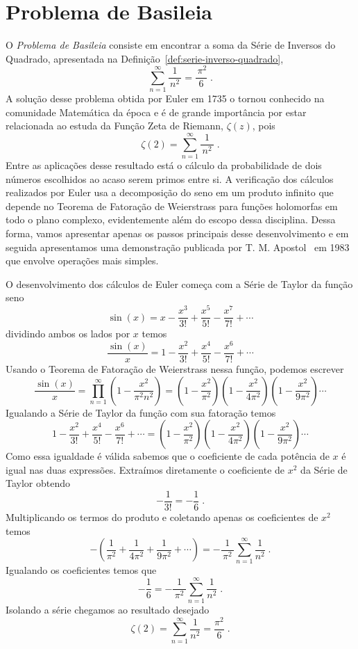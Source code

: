 \section{Problema de Basileia}
\label{sec:problema-Basileia}

O \emph{Problema de Basileia} consiste em
encontrar a soma da Série de Inversos do Quadrado,
apresentada na Definição~\ref{def:serie-inverso-quadrado},
\[
\sum_{n=1}^\infty \frac{1}{\,n^2\,} = \frac{\,\pi^2}{6}    \;.
\]
A solução desse problema obtida por Euler em 1735 o tornou conhecido na comunidade
Matemática da época e é de grande importância
por estar relacionada ao estuda da Função Zeta de Riemann, $\zeta(z)$,
pois
\[
\zeta(2) = \sum_{n=1}^\infty \frac{1}{\,n^2\,}    \;.
\]
Entre as aplicações desse resultado está o cálculo da probabilidade de dois
números escolhidos ao acaso serem primos entre si.
A verificação dos cálculos realizados por Euler usa a decomposição do seno
em um produto infinito que depende no Teorema de Fatoração de Weierstrass
para funções holomorfas
em todo o plano complexo, evidentemente além do escopo dessa disciplina.
Dessa forma, vamos apresentar apenas os passos principais desse desenvolvimento
e em seguida apresentamos uma demonstração
publicada por T. M. Apostol~\cite{Apostol-Proof-Euler-Missed} em 1983
que envolve operações mais simples.

O desenvolvimento dos cálculos de Euler começa com a Série de Taylor da função seno
\[
\sin(x) = x
- \frac{x^3}{3!}
+ \frac{x^5}{5!}
- \frac{x^7}{7!}
+ \cdots
\]
dividindo ambos os lados por $x$ temos
\[
\frac{\sin(x)}{x} = 1
- \frac{x^2}{3!}
+ \frac{x^4}{5!}
- \frac{x^6}{7!}
+ \cdots
\]
Usando o Teorema de Fatoração de Weierstrass nessa função, podemos escrever
\[
\frac{\sin(x)}{x} = \prod_{n=1}^{\infty} \left(1-\frac{x^2}{\pi^2n^2}\right)
= \left(1-\frac{x^2}{ \pi^2}\right)
\left(1-\frac{x^2}{4\pi^2}\right)
\left(1-\frac{x^2}{9\pi^2}\right)
\cdots
\]
Igualando a Série de Taylor da função com sua fatoração temos
\begin{equation}
  \label{eq:fatoracao_seno}
  1
  - \frac{x^2}{3!}
  + \frac{x^4}{5!}
  - \frac{x^6}{7!}
  + \cdots
  = \left(1-\frac{x^2}{ \pi^2}\right)
  \left(1-\frac{x^2}{4\pi^2}\right)
  \left(1-\frac{x^2}{9\pi^2}\right)
  \cdots
\end{equation}
Como essa igualdade é válida sabemos que o coeficiente de cada potência
de $x$ é igual nas duas expressões.
Extraímos diretamente o coeficiente de $x^2$ da Série de Taylor
obtendo
\[
-\frac{1}{3!} = -\frac{1}{6}    \;.
\]
Multiplicando os termos do produto e coletando apenas os
coeficientes de $x^2$ temos
\[
-\left( \frac{1}{ \pi^2}
+ \frac{1}{4\pi^2}
+ \frac{1}{9\pi^2}
+ \cdots
\right)
= - \frac{1}{\,\pi^2\,} \sum_{n=1}^\infty \frac{1}{n^2}    \;.
\]
Igualando os coeficientes temos que
\[
- \frac{1}{6}
= - \frac{1}{\,\pi^2\,} \sum_{n=1}^\infty \frac{1}{n^2}    \;.
\]
Isolando a série chegamos ao resultado desejado
\[
\zeta(2) = \sum_{n=1}^\infty \frac{1}{n^2} = \frac{\pi^2}{6}    \;.
\]

